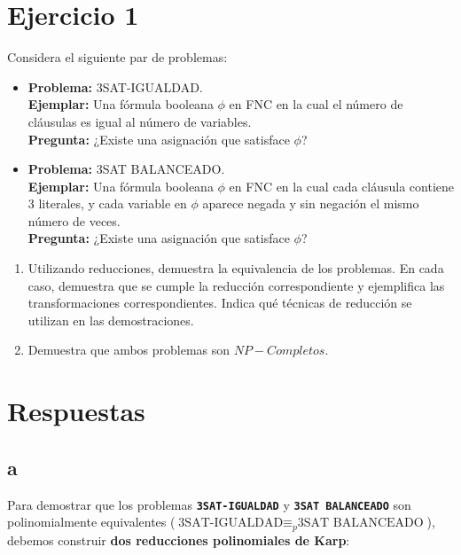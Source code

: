\section{Ejercicio 1}


\begin{tcolorbox}[enunciado]
Considera el siguiente par de problemas:
\begin{itemize}
    \item \textbf{Problema:} 3SAT-IGUALDAD. \\ 
    \textbf{Ejemplar:} Una fórmula booleana $\phi$ en FNC en la cual el número de cláusulas es igual al número de variables. \\
    \textbf{Pregunta:} ¿Existe una asignación que satisface $\phi$?
    \item \textbf{Problema:} 3SAT BALANCEADO. \\
    \textbf{Ejemplar:} Una fórmula booleana $\phi$ en FNC en la cual cada cláusula contiene 3 literales, y cada variable en $\phi$ aparece negada y sin negación el mismo número de veces. \\
    \textbf{Pregunta:} ¿Existe una asignación que satisface $\phi$?
\end{itemize}
\begin{enumerate}[label=(\alph*)]
    \item Utilizando reducciones, demuestra la equivalencia de los problemas. En cada caso, demuestra que se cumple la reducción correspondiente y ejemplifica las transformaciones correspondientes. Indica qué técnicas de reducción se utilizan en las demostraciones.
    \item Demuestra que ambos problemas son $NP-Completos.$
\end{enumerate}
\end{tcolorbox}

\section*{Respuestas}
\subsection{a}

Para demostrar que los problemas \textbf{\texttt{3SAT-IGUALDAD}} y \textbf{\texttt{3SAT BALANCEADO}} son polinomialmente equivalentes ($\text{3SAT-IGUALDAD} \equiv_p \text{3SAT BALANCEADO}$), debemos construir \textbf{dos reducciones polinomiales de Karp}:

